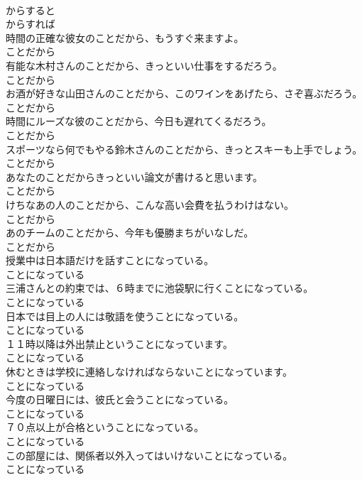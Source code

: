 \documentclass[8pt]{extreport}
\begin{document}
\begin{CJK}{UTF8}{min}
\\	からすると 
\\	からすれば
\\	時間の正確な彼女のことだから、もうすぐ来ますよ。	
\\	ことだから
\\	有能な木村さんのことだから、きっといい仕事をするだろう。	
\\	ことだから
\\	お酒が好きな山田さんのことだから、このワインをあげたら、さぞ喜ぶだろう。	
\\	ことだから
\\	時間にルーズな彼のことだから、今日も遅れてくるだろう。	
\\	ことだから
\\	スポーツなら何でもやる鈴木さんのことだから、きっとスキーも上手でしょう。	
\\	ことだから
\\	あなたのことだからきっといい論文が書けると思います。	
\\	ことだから
\\	けちなあの人のことだから、こんな高い会費を払うわけはない。	
\\	ことだから
\\	あのチームのことだから、今年も優勝まちがいなしだ。	
\\	ことだから
\\	授業中は日本語だけを話すことになっている。	
\\	ことになっている
\\	三浦さんとの約束では、６時までに池袋駅に行くことになっている。	
\\	ことになっている
\\	日本では目上の人には敬語を使うことになっている。	
\\	ことになっている
\\	１１時以降は外出禁止ということになっています。	
\\	ことになっている
\\	休むときは学校に連絡しなければならないことになっています。	
\\	ことになっている
\\	今度の日曜日には、彼氏と会うことになっている。	
\\	ことになっている
\\	７０点以上が合格ということになっている。	
\\	ことになっている
\\	この部屋には、関係者以外入ってはいけないことになっている。	
\\	ことになっている

\end{CJK}
\end{document}
